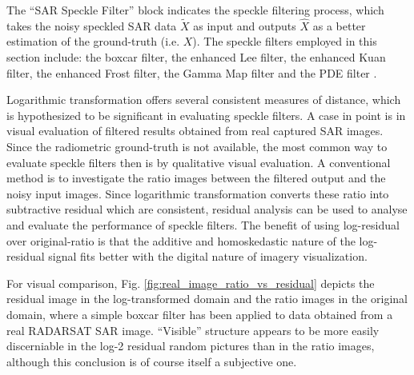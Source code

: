 The ``SAR Speckle Filter'' block indicates the speckle filtering process, 
	which takes the noisy speckled SAR data $\tilde{X}$ as input
	and outputs $\hat{X}$ as a better estimation of the ground-truth (i.e. $X$).
The speckle filters employed in this section include: 
	the boxcar filter, the enhanced Lee filter, the enhanced Kuan filter, the enhanced Frost filter, the Gamma Map filter 
	and the PDE filter \cite{You_TIP_2000}.

Logarithmic transformation offers several consistent measures of distance, which is hypothesized to be 
significant in evaluating speckle filters.
	A case in point is in visual evaluation of filtered results obtained from real captured SAR images.
Since the radiometric ground-truth is not available, %
	the most common way to evaluate speckle filters then is by qualitative visual evaluation.
A conventional method is to investigate the ratio images between the filtered output and the noisy input images.
Since logarithmic transformation converts these ratio into subtractive residual which are consistent, residual 
analysis can be used to analyse and evaluate the performance of speckle filters.
The benefit of using log-residual over original-ratio is that the additive and homoskedastic nature of the log-residual signal fits better with the digital nature of imagery visualization.

For visual comparison, Fig. \ref{fig:real_image_ratio_vs_residual} depicts the residual image in the log-transformed domain 
and the ratio images in the original domain, where a simple boxcar filter has been applied to data obtained from a 
real RADARSAT SAR image.
``Visible'' structure appears to be more easily discerniable in the log-2 residual random pictures than in 
the ratio images, although this conclusion is of course itself a subjective one.


